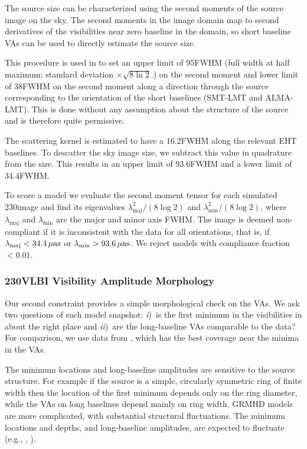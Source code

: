 The source size can be characterized using the second moments of the
source image on the sky.
The second moments in the image domain map to second derivatives of
the visibilities near zero baseline in the \uv domain, so short
baseline VAs can be used to directly estimate the source size.

This procedure is used in  to set an upper limit
of 95\uas FWHM (full width at half maximum; standard deviation $\times \sqrt{8\ln{2}}$.) on the second moment and lower limit of 38\uas FWHM on the second moment along a direction
through the source corresponding to the orientation of the short
baselines (SMT-LMT and ALMA-LMT).  This is done without any assumption
about the structure of the source and is therefore quite  permissive.

The scattering kernel is estimated to have a 16.2\uas FWHM along the
relevant EHT baselines.
To descatter the sky image size, we subtract this value in quadrature
from the size.
This results in an upper limit of 93.6\uas FWHM and a lower limit of
34.4\uas FWHM.

To score a model we evaluate the second moment tensor for each simulated 230\GHz image
and find its eigenvalues $\lambda_\mathrm{maj}^2/(8\log 2)$ and $\lambda_\mathrm{min}^2/(8\log
2)$, where $\lambda_\mathrm{maj}$ and $\lambda_\mathrm{min}$ are the major and minor axis
FWHM.
The image is deemed non-compliant if it is inconsistent with the data for
all orientations, that is, if $\lambda_\mathrm{maj} < 34.4\,\mathrm{\mu as}$ or
$\lambda_\mathrm{min} > 93.6\,\mathrm{\mu as}$.
We reject models with compliance fraction $< 0.01$.

\subsubsection{230\GHz VLBI Visibility Amplitude Morphology}

Our second constraint provides a simple morphological check on the
VAs.  We ask two questions of each model snapshot: \emph{i})~is the first
minimum in the visibilities in about the right place and
\emph{ii})~are the long-baseline VAs comparable to the data?
For comparison, we use data from \aprilvii, which has the best \uv
coverage near the minima in the VAs.

The minimum locations and long-baseline amplitudes are sensitive to the
source structure.
For example if the source is a simple, circularly symmetric ring of
finite width then the location of the first minimum depends only on
the ring diameter, while the VAs on long baselines depend mainly on
ring width.
GRMHD models are more complicated, with substantial structural
fluctuations.
The minimum locations and depths, and long-baseline amplitudes, are
expected to fluctuate (e.g., \citealt{2018ApJ...856..163M},
).

